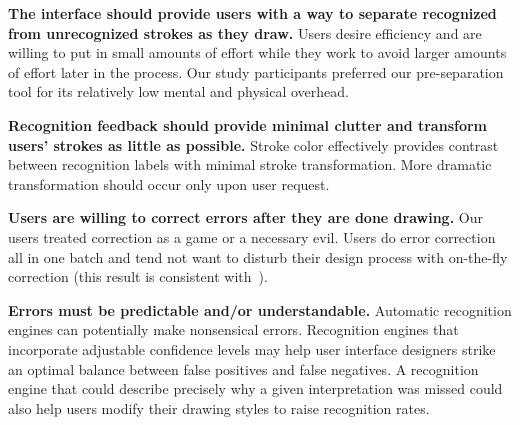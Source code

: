 \documentclass{egpubl}
\begin{document}
\textbf{The interface should provide users with a way to separate
recognized from unrecognized strokes as they draw.}  Users desire
efficiency and are willing to put in small amounts of effort while they
work to avoid larger amounts of effort later in the process.  Our
study participants preferred our pre-separation tool for its relatively low
mental and physical overhead.

\textbf{Recognition feedback should provide minimal clutter and
transform users' strokes as little as possible.} Stroke color
effectively provides contrast between recognition labels with minimal
stroke transformation.  More dramatic transformation
should occur only upon user request.

\textbf{Users are willing to correct errors after they are done
drawing.}  Our users treated correction as a game or a necessary evil.
Users do error correction all in one batch and tend not want to
disturb their design process with on-the-fly correction (this result
is consistent with~\cite{Hong2002Sketch}).

\textbf{Errors must be predictable and/or understandable.} Automatic
recognition engines can potentially make nonsensical errors.
Recognition engines that incorporate adjustable confidence levels may
help user interface designers strike an optimal balance between false
positives and false negatives.  A recognition engine that could
describe precisely why a given interpretation was missed could also help 
users modify their drawing styles to raise recognition rates.  


\end{document}
